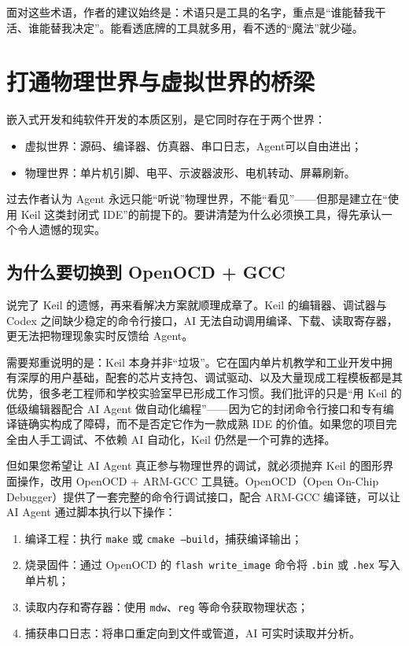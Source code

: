 面对这些术语，作者的建议始终是：术语只是工具的名字，重点是“谁能替我干活、谁能替我决定”。能看透底牌的工具就多用，看不透的“魔法”就少碰。


\section{打通物理世界与虚拟世界的桥梁}

嵌入式开发和纯软件开发的本质区别，是它同时存在于两个世界：

\begin{itemize}
	\item 虚拟世界：源码、编译器、仿真器、串口日志，Agent可以自由进出；
	\item 物理世界：单片机引脚、电平、示波器波形、电机转动、屏幕刷新。
\end{itemize}

过去作者认为 Agent 永远只能“听说”物理世界，不能“看见”——但那是建立在“使用 Keil 这类封闭式 IDE”的前提下的。要讲清楚为什么必须换工具，得先承认一个令人遗憾的现实。

\subsection{为什么要切换到 OpenOCD + GCC}

说完了 Keil 的遗憾，再来看解决方案就顺理成章了。Keil 的编辑器、调试器与 Codex 之间缺少稳定的命令行接口，AI 无法自动调用编译、下载、读取寄存器，更无法把物理现象实时反馈给 Agent。

需要郑重说明的是：Keil 本身并非“垃圾”。它在国内单片机教学和工业开发中拥有深厚的用户基础，配套的芯片支持包、调试驱动、以及大量现成工程模板都是其优势，很多老工程师和学校实验室早已形成工作习惯。我们批评的只是“用 Keil 的低级编辑器配合 AI Agent 做自动化编程”——因为它的封闭命令行接口和专有编译链确实构成了障碍，而不是否定它作为一款成熟 IDE 的价值。如果您的项目完全由人手工调试、不依赖 AI 自动化，Keil 仍然是一个可靠的选择。

但如果您希望让 AI Agent 真正参与物理世界的调试，就必须抛弃 Keil 的图形界面操作，改用 OpenOCD + ARM-GCC 工具链。OpenOCD（Open On-Chip Debugger）提供了一套完整的命令行调试接口，配合 ARM-GCC 编译链，可以让 AI Agent 通过脚本执行以下操作：

\begin{enumerate}
	\item 编译工程：执行 \texttt{make} 或 \texttt{cmake --build}，捕获编译输出；
	\item 烧录固件：通过 OpenOCD 的 \texttt{flash write\_image} 命令将 \texttt{.bin} 或 \texttt{.hex} 写入单片机；
	\item 读取内存和寄存器：使用 \texttt{mdw}、\texttt{reg} 等命令获取物理状态；
	\item 捕获串口日志：将串口重定向到文件或管道，AI 可实时读取并分析。
\end{enumerate}

